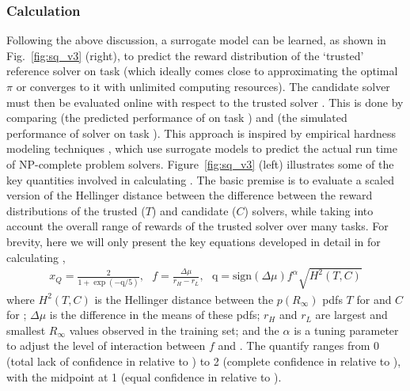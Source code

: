 \subsubsection{Calculation} \label{sec:methodology}
Following the above discussion, a surrogate model \surrogate{} can be learned,  as shown in Fig.~\ref{fig:sq_v3} (right), to predict the reward distribution \rwdstarapprox{} of the `trusted' reference solver \solvestar{} on task \task{} (which ideally comes close to approximating the optimal $\pi$ or converges to it with unlimited computing resources). The candidate solver \solve{} must then be evaluated online with respect to the trusted solver \solvestar{}. This is done by comparing \rwdstarapprox{} (the predicted performance of \solvestar{} on task \task) and \rwd{} (the simulated performance of solver \solve{} on task \task). %
This approach is inspired by empirical hardness modeling techniques \cite{Leyton-Brown2009-yr}, which use surrogate models to predict the actual run time of NP-complete problem solvers. 
Figure~\ref{fig:sq_v3} (left) illustrates some of the key quantities involved in calculating \xQ{}. The basic premise is to evaluate a scaled version of the Hellinger distance between the difference between the reward distributions of the trusted ($T$) and candidate ($C$) solvers, while taking into account the overall range of rewards of the trusted solver over many tasks. %
For brevity, here we will only present the key equations developed in detail in \cite{Israelsen2018-qz} for calculating \xQ{}, 
\begin{align}
    x_{Q} = \frac{2}{1+\exp(-\text{q}/5)}, \ \ \
    f = \frac{\Delta \mu}{r_H - r_L}, \ \ \
    \text{q} = \text{sign}(\Delta \mu)f^{\alpha}\sqrt{H^{2}(T,C)} \label{eq:SQ} %
\end{align}
where $H^2(T,C)$ is the Hellinger distance between the $p(R_{\infty})$ pdfs $T$ for \solvestar{} and $C$ for \solve{}; $\Delta \mu$ is the difference in the means of these pdfs; %
$r_H$ and $r_L$ are largest and smallest $R_{\infty}$ values observed in the \solvestar{} training set; and the $\alpha$ is a tuning parameter to adjust the level of interaction between $f$ and \hell{}. The quantify \xQ{} ranges from 0 (total lack of confidence in \solve{} relative to \solvestar{}) to 2 (complete confidence in \solve{} relative to \solvestar{}), with the midpoint at 1 (equal confidence in \solve{} relative to \solvestar{}). 

